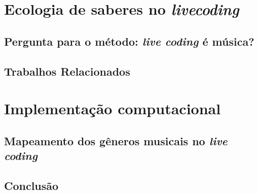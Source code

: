 \documentclass[
	12pt,				%
	openright,			%
	twoside,			%
	a4paper,			%
	english,			%
	french,				%
	spanish,			%
        italian,                        %
	brazil				%
	]{abntex2}
\begin{document}


\part{Ecologia de saberes no \emph{livecoding}}\label{parte1}

\chapter{Pergunta para o método: \emph{live coding} é música?}\label{cap:introducao}



\chapter{Trabalhos Relacionados}\label{cap:trabalhos_relacionados}


\part{Implementação computacional}\label{parte2}

\chapter{Mapeamento dos gêneros musicais no \emph{live coding}}\label{cap:resultados}



\chapter{Conclusão}


%
\postextual



%
%
\end{document}
